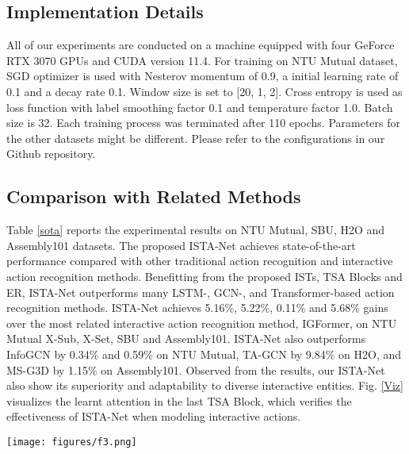 \documentclass[letterpaper, 10 pt, conference]{ieeeconf}
\begin{document}
\subsection{Implementation Details}
All of our experiments are conducted on a machine equipped with four GeForce RTX 3070 GPUs and CUDA version 11.4. For training on NTU Mutual dataset, SGD optimizer is used with Nesterov momentum of 0.9, a initial learning rate of 0.1 and a decay rate 0.1. Window size is set to [20, 1, 2]. Cross entropy is used as loss function with label smoothing factor 0.1 and temperature factor 1.0. Batch size is 32. Each training process was terminated after 110 epochs. Parameters for the other datasets might be different. Please refer to the configurations in our Github repository. 

\subsection{Comparison with Related Methods}

Table \ref{sota} reports the experimental results on NTU Mutual, SBU, H2O and Assembly101 datasets. The proposed ISTA-Net achieves state-of-the-art performance compared with other traditional action recognition and interactive action recognition methods. Benefitting from the proposed ISTs, TSA Blocks and ER, ISTA-Net outperforms many LSTM-, GCN-, and Transformer-based action recognition methods. ISTA-Net achieves 5.16\%, 5.22\%, 0.11\% and 5.68\% gains over the most related interactive action recognition method, IGFormer\cite{igformer2022}, on NTU Mutual X-Sub, X-Set, SBU and Assembly101. ISTA-Net also outperforms InfoGCN\cite{InfoGCN2022} by 0.34\% and 0.59\% on NTU Mutual, TA-GCN\cite{H2O_TA-GCN2021} by 9.84\% on H2O, and MS-G3D\cite{MS-G3D2020} by 1.15\% on Assembly101. Observed from the results, our ISTA-Net also show its superiority and adaptability to diverse interactive entities. Fig. \ref{Viz} visualizes the learnt attention in the last TSA Block, which verifies the effectiveness of ISTA-Net when modeling interactive actions.


\begin{figure*}[t]
    \begin{center}
    \texttt{[image: figures/f3.png]}
    \end{center}
    \vspace{-1.2em}
    \caption{Visualization of the learnt interactive relations restored from the last TSA Block. The attentive weights are visualized to illustrate the important body parts involved in recognizing different interactive actions. Specifically, ISTA-Net recognizes the \textit{Punch} action through attentions on the attacker's hands and the victim's limbs. The \textit{Hugging} action is recognized through attentions on the approaching and contacting body parts. The \textit{Giving Object} action is recognized through attentions on the hands.}
    \label{Viz}
    \vspace{-0.3em}
\end{figure*}
\end{document}
